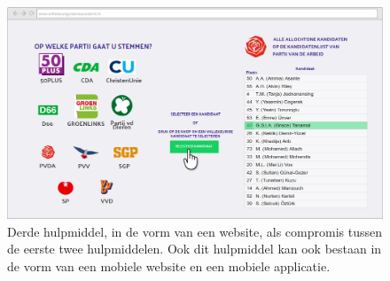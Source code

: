 \begin{figure}[H]


	\includegraphics[width=\linewidth]{website_verkiezingen2.png}

			\caption{Derde hulpmiddel, in de vorm van een website, als compromis tussen de eerste twee hulpmiddelen. Ook dit hulpmiddel kan ook bestaan in de vorm van een mobiele website en een mobiele applicatie.}

\label{fig:verkC}
\end{figure}

\newpage 